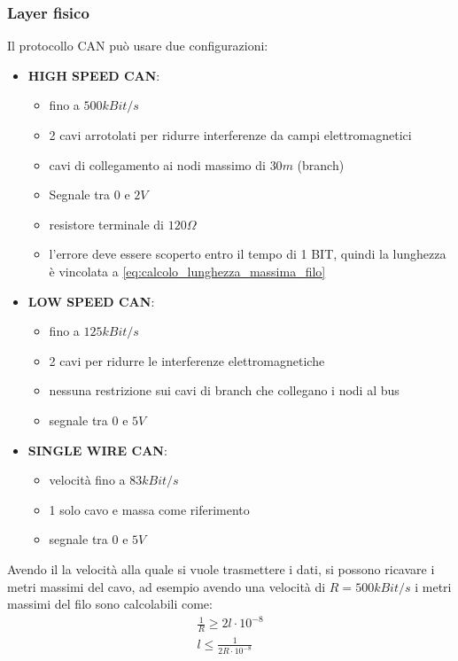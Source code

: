 \subsubsection{Layer fisico}
Il protocollo CAN può usare due configurazioni:
\begin{itemize}
  \item \textbf{HIGH SPEED CAN}:
    \begin{itemize}
      \item fino a $500kBit/s$
      \item 2 cavi arrotolati per ridurre interferenze da campi elettromagnetici
      \item cavi di collegamento ai nodi massimo di $30m$ (branch)
      \item Segnale tra $0$ e $2V$
      \item resistore terminale di $120\Omega $
      \item l'errore deve essere scoperto entro il tempo di 1 BIT, quindi la lunghezza è vincolata a \autoref{eq:calcolo_lunghezza_massima_filo}
    \end{itemize}
  \item \textbf{LOW SPEED CAN}:
    \begin{itemize}
      \item fino a $125kBit/s$
      \item 2 cavi per ridurre le interferenze elettromagnetiche
      \item nessuna restrizione sui cavi di branch che collegano i nodi al bus
      \item segnale tra $0$ e $5V$
    \end{itemize}
  \item \textbf{SINGLE WIRE CAN}:
    \begin{itemize}
      \item velocità fino a $83kBit/s$
      \item 1 solo cavo e massa come riferimento
      \item segnale tra $0$ e $5V$
    \end{itemize}
\end{itemize}



Avendo il la velocità alla quale si vuole trasmettere i dati, si possono ricavare i metri massimi del cavo, ad esempio avendo una velocità di $R = 500kBit/s$ i metri massimi del filo sono calcolabili come:
\begin{align}
  \frac{1}{R} \geq 2 l \cdot 10^{-8} \\
  l \leq \frac{1}{2R \cdot 10^{-8}}
  \label{eq:calcolo_lunghezza_massima_filo}
\end{align}

